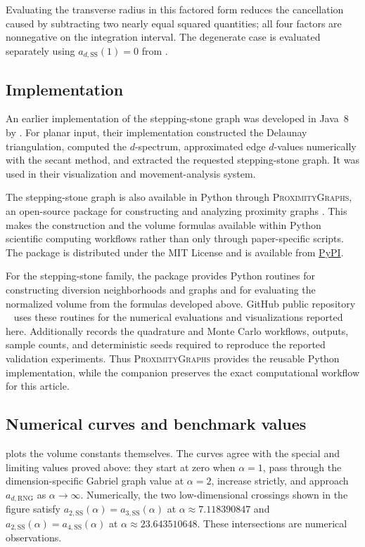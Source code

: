 \documentclass[a4paper,fleqn]{cas-dc}
\theoremstyle{definition}
\theoremstyle{remark}
\newcommand{\0}{\mathbf{0}}
\newcommand{\tb}[1]{\textcolor[HTML]{0000bb}{#1}}
\begin{document}
Evaluating the transverse radius in this factored form reduces the
cancellation caused by subtracting two nearly equal squared quantities;
all four factors are nonnegative on the integration interval.
The degenerate case is evaluated separately using
$a_{d,\mathrm{SS}}(1)=0$ from .

\subsection{Implementation}
\label{sec:implementation}

An earlier implementation of the stepping-stone graph was developed in
Java~8 by \citet[Sec.~4.2]{kannangara2018stepping}. For planar input, their
implementation constructed the Delaunay triangulation, computed the
$d$-spectrum, approximated edge $d$-values numerically with the secant
method, and extracted the requested stepping-stone graph. It was used in
their visualization and movement-analysis system.

The stepping-stone graph is also available in Python through
\textsc{ProximityGraphs}, an open-source package for constructing and
analyzing proximity graphs \tb{\citep{maravillo2026proximitygraphs}.} This makes
the construction and the volume formulas available within Python scientific
computing workflows rather than only through paper-specific scripts. The
package is distributed under the MIT License and is available from
\href{https://pypi.org/project/proximitygraphs/}{PyPI}.

For the stepping-stone family, the package provides Python routines for
constructing diversion neighborhoods and graphs and for evaluating the
normalized volume from the formulas developed above. GitHub public repository 
~\citep{espino2026computational} uses these routines
for the numerical evaluations and visualizations reported here.
Additionally records the quadrature and Monte Carlo workflows,
outputs, sample counts, and deterministic seeds required to reproduce the
reported validation experiments. Thus \textsc{ProximityGraphs} provides the
reusable Python implementation, while the companion preserves the exact
computational workflow for this article.


\subsection{Numerical curves and benchmark values}

 plots the volume constants themselves. The curves
agree with the special and limiting values proved above: they start at zero
when $\alpha=1$, pass through the dimension-specific Gabriel graph value at
$\alpha=2$, increase strictly, and approach $a_{d,\mathrm{RNG}}$ as
$\alpha\to\infty$. Numerically, the two low-dimensional crossings shown in
the figure satisfy
$a_{2,\mathrm{SS}}(\alpha)=a_{3,\mathrm{SS}}(\alpha)$ at
$\alpha\approx7.118390847$ and
$a_{2,\mathrm{SS}}(\alpha)=a_{4,\mathrm{SS}}(\alpha)$ at
$\alpha\approx23.643510648$. These intersections are numerical observations.
\end{document}
